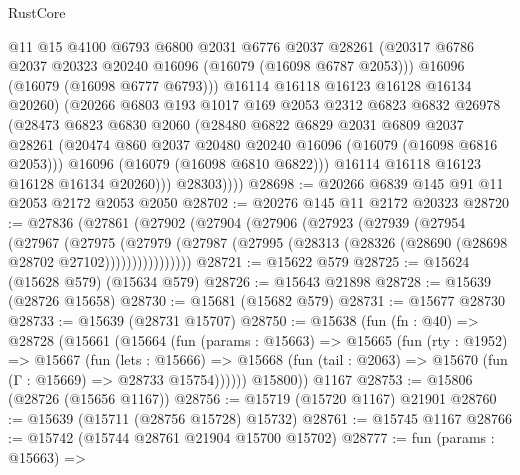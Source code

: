 \begin{lexlean}{RustCore}
\begin{coremodule}
                  @11
                  @15
                  @4100
                  @6793
                  @6800
                  @2031
                  @6776
                  @2037
                  @28261
                  (@20317 @6786 @2037 @20323 @20240 @16096 (@16079 (@16098 @6787 @2053)))
                  @16096
                  (@16079 (@16098 @6777 @6793)))
                @16114
                @16118
                @16123
                @16128
                @16134
                @20260)
              (@20266
                @6803
                @193
                @1017
                @169
                @2053
                @2312
                @6823
                @6832
                @26978
                (@28473
                  @6823
                  @6830
                  @2060
                  (@28480
                    @6822
                    @6829
                    @2031
                    @6809
                    @2037
                    @28261
                    (@20474 @860 @2037 @20480 @20240 @16096 (@16079 (@16098 @6816 @2053)))
                    @16096
                    (@16079 (@16098 @6810 @6822)))
                  @16114
                  @16118
                  @16123
                  @16128
                  @16134
                  @20260)))
            @28303))))
@28698 := @20266 @6839 @145 @91 @11 @2053 @2172 @2053 @2050
@28702 := @20276 @145 @11 @2172 @20323
@28720 := @27836
    (@27861
      (@27902
        (@27904
          (@27906
            (@27923
              (@27939
                (@27954
                  (@27967
                    (@27975
                      (@27979
                        (@27987
                          (@27995 (@28313 (@28326 (@28690 (@28698 @28702 @27102))))))))))))))))
@28721 := @15622 @579
@28725 := @15624 (@15628 @579) (@15634 @579)
@28726 := @15643 @21898
@28728 := @15639 (@28726 @15658)
@28730 := @15681 (@15682 @579)
@28731 := @15677 @28730
@28733 := @15639 (@28731 @15707)
@28750 := @15638
    (fun (fn : @40) =>
    @28728
      (@15661
        (@15664
          (fun (params : @15663) =>
          @15665
            (fun (rty : @1952) =>
            @15667
              (fun (lets : @15666) =>
              @15668 (fun (tail : @2063) => @15670 (fun (Γ : @15669) => @28733 @15754))))))
        @15800))
    @1167
@28753 := @15806 (@28726 (@15656 @1167))
@28756 := @15719 (@15720 @1167) @21901
@28760 := @15639 (@15711 (@28756 @15728) @15732)
@28761 := @15745 @1167
@28766 := @15742 (@15744 @28761 @21904 @15700 @15702)
@28777 := fun (params : @15663) =>

\end{coremodule}
\end{lexlean}
